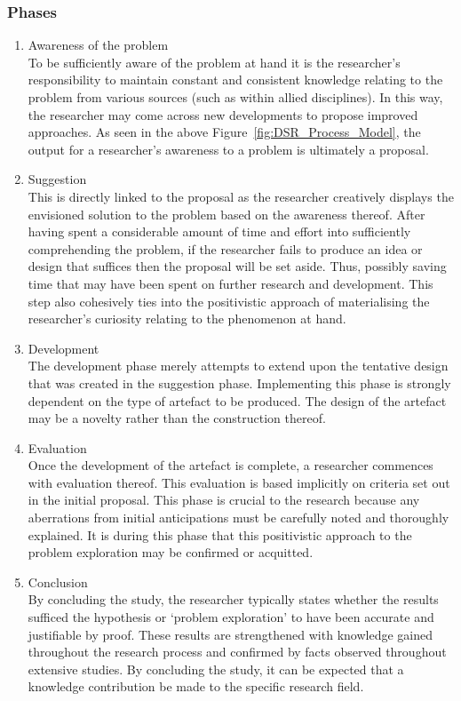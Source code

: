 \subsubsection{Phases}
\begin{enumerate}[label=\roman*.]
	\item Awareness of the problem\\
	To be sufficiently aware of the problem at hand it is the researcher’s responsibility to maintain constant and consistent knowledge relating to the problem from various sources (such as within allied disciplines). In this way, the researcher may come across new developments to propose improved approaches. As seen in the above Figure~\ref{fig:DSR_Process_Model}, the output for a researcher’s awareness to a problem is ultimately a proposal.
	
	\item Suggestion \\
	This is directly linked to the proposal as the researcher creatively displays the envisioned solution to the problem based on the awareness thereof. After having spent a considerable amount of time and effort into sufficiently comprehending the problem, if the researcher fails to produce an idea or design that suffices then the proposal will be set aside. Thus, possibly saving time that may have been spent on further research and development.
This step also cohesively ties into the positivistic approach of materialising the researcher’s curiosity relating to the phenomenon at hand.

	\item Development \\
	The development phase merely attempts to extend upon the tentative design that was created in the suggestion phase. Implementing this phase is strongly dependent on the type of artefact to be produced. The design of the artefact may be a novelty rather than the construction thereof.
	
	\item Evaluation \\
	Once the development of the artefact is complete, a researcher commences with evaluation thereof. This evaluation is based implicitly on criteria set out in the initial proposal. This phase is crucial to the research because any aberrations from initial anticipations must be carefully noted and thoroughly explained. It is during this phase that this positivistic approach to the problem exploration may be confirmed or acquitted. 
	
	\item Conclusion \\
	By concluding the study, the researcher typically states whether the results sufficed the hypothesis or ‘problem exploration’ to have been accurate and justifiable by proof. These results are strengthened with knowledge gained throughout the research process and confirmed by facts observed throughout extensive studies. By concluding the study, it can be expected that a knowledge contribution be made to the specific research field.
\end{enumerate}

